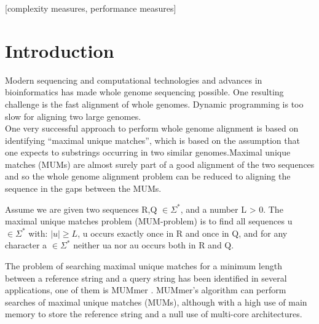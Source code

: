 \documentclass{acm_proc_article-sp}
\begin{document}
[complexity measures, performance measures]



\section{Introduction} 
Modern sequencing and computational technologies and advances in bioinformatics has made whole genome sequencing possible. One resulting challenge is the fast alignment of whole genomes. Dynamic programming is too slow for aligning two large genomes.\\
One very successful approach to perform whole genome alignment is based on identifying ``maximal unique matches'', which is based on the assumption that one expects to substrings occurring in two similar genomes.Maximal unique matches (MUMs) are almost surely part of a good alignment of the two sequences and so the whole genome alignment problem can be reduced to aligning the sequence in the gaps between the MUMs.
\begin{definition}
Assume we are given two sequences R,Q $\in \Sigma^*$, and a number L > 0. The maximal unique matches problem (MUM-problem) is to find all sequences u $\in \Sigma^*$ with: $|u|\geq L$, u occurs exactly once in R and once in Q, and for any character a $\in \Sigma^*$ neither ua nor au occurs both in R and Q.
\end{definition}
The problem of searching maximal unique matches for a minimum length between a reference string and a query string has been
identified in several applications, one of them is MUMmer \cite{Delcher2003}. MUMmer's algorithm can perform searches of maximal unique matches (MUMs), although
with a high use of main memory to store the reference string and a null use of multi-core architectures.
\end{document}
